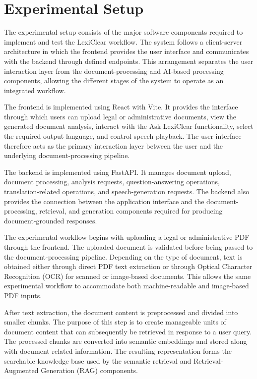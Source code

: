 \documentclass[12pt,a4paper,oneside]{report}
\begin{document}
\section{Experimental Setup}

The experimental setup consists of the major software components required to
implement and test the LexiClear workflow. The system follows a client-server
architecture in which the frontend provides the user interface and communicates
with the backend through defined endpoints. This arrangement separates the
user interaction layer from the document-processing and AI-based processing
components, allowing the different stages of the system to operate as an
integrated workflow.

The frontend is implemented using React with Vite. It provides the interface
through which users can upload legal or administrative documents, view the
generated document analysis, interact with the Ask LexiClear functionality,
select the required output language, and control speech playback. The user
interface therefore acts as the primary interaction layer between the user and
the underlying document-processing pipeline.

The backend is implemented using FastAPI. It manages document upload,
document processing, analysis requests, question-answering operations,
translation-related operations, and speech-generation requests. The backend
also provides the connection between the application interface and the
document-processing, retrieval, and generation components required for
producing document-grounded responses.

The experimental workflow begins with uploading a legal or administrative PDF
through the frontend. The uploaded document is validated before being passed
to the document-processing pipeline. Depending on the type of document, text
is obtained either through direct PDF text extraction or through Optical
Character Recognition (OCR) for scanned or image-based documents. This allows
the same experimental workflow to accommodate both machine-readable and
image-based PDF inputs.

After text extraction, the document content is preprocessed and divided into
smaller chunks. The purpose of this step is to create manageable units of
document content that can subsequently be retrieved in response to a user
query. The processed chunks are converted into semantic embeddings and stored
along with document-related information. The resulting representation forms
the searchable knowledge base used by the semantic retrieval and
Retrieval-Augmented Generation (RAG) components.
\end{document}

